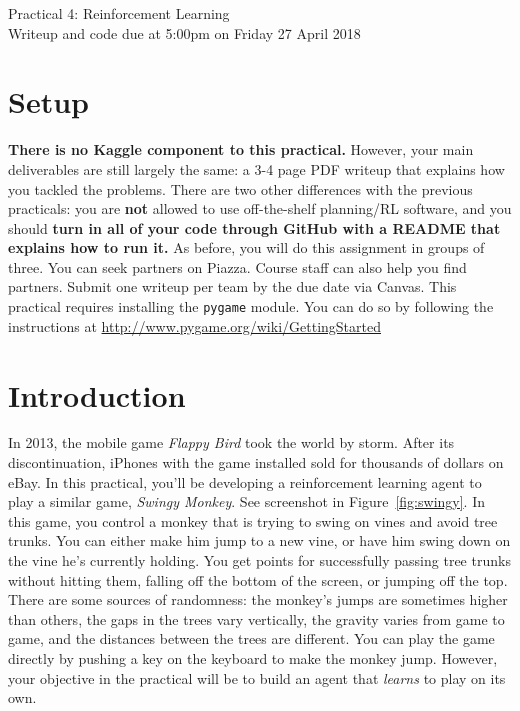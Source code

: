 \documentclass[12pt]{article}
\begin{document}
\begin{center}
{\Large Practical 4: Reinforcement Learning}\\
Writeup and code due at 5:00pm on Friday 27 April 2018\\
\end{center}

\section*{Setup}

{\bf There is no Kaggle component to this practical.}  However, your main deliverables are still largely the same: a 3-4 page PDF writeup that explains how you tackled the problems.  There are two other differences with the previous practicals: you are \textbf{not} allowed to use off-the-shelf planning/RL software, and you should {\bf turn in all of your code through GitHub with a README that explains how to run it.} As before, you will do this assignment in groups of three.  You can seek partners on Piazza.  Course staff can also help you find partners. Submit one writeup per team by the due date via Canvas.  This practical requires installing the \verb|pygame| module. You can do so by following the instructions at \url{http://www.pygame.org/wiki/GettingStarted}


\section*{Introduction}

In 2013, the mobile game \emph{Flappy Bird} took the world by storm.  After its discontinuation, iPhones with the game installed sold for thousands of dollars on eBay.  In this practical, you'll be developing a reinforcement learning agent to play a similar game, \emph{Swingy Monkey}.  See screenshot in Figure~\ref{fig:swingy}.  In this game, you control a monkey that is trying to swing on vines and avoid tree trunks.  You can either make him jump to a new vine, or have him swing down on the vine he's currently holding.  You get points for successfully passing tree trunks without hitting them, falling off the bottom of the screen, or jumping off the top.  There are some sources of randomness: the monkey's jumps are sometimes higher than others, the gaps in the trees vary vertically, the gravity varies from game to game, and the distances between the trees are different.  You can play the game directly by pushing a key on the keyboard to make the monkey jump.  However, your objective in the practical will be to build an agent that \emph{learns} to play on its own. 
\end{document}
